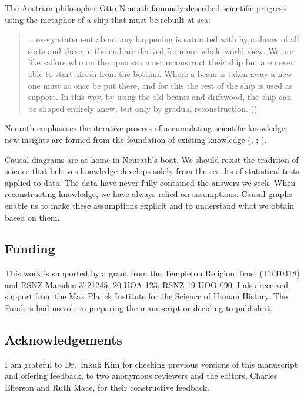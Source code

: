 \documentclass[
  single column]{article}
\begin{document}
The Austrian philosopher Otto Neurath famously described scientific
progress using the metaphor of a ship that must be rebuilt at sea:

\begin{quote}
\ldots{} every statement about any happening is saturated with
hypotheses of all sorts and these in the end are derived from our whole
world-view. We are like sailors who on the open sea must reconstruct
their ship but are never able to start afresh from the bottom. Where a
beam is taken away a new one must at once be put there, and for this the
rest of the ship is used as support. In this way, by using the old beams
and driftwood, the ship can be shaped entirely anew, but only by gradual
reconstruction. ()
\end{quote}

Neurath emphasises the iterative process of accumulating scientific
knowledge; new insights are formed from the foundation of existing
knowledge (,
;
).

Causal diagrams are at home in Neurath's boat. We should resist the
tradition of science that believes knowledge develops solely from the
results of statistical tests applied to data. The data have never fully
contained the answers we seek. When reconstructing knowledge, we have
always relied on assumptions. Causal graphs enable us to make these
assumptions explicit and to understand what we obtain based on them.

\newpage{}

\subsection{Funding}\label{funding}

This work is supported by a grant from the Templeton Religion Trust
(TRT0418) and RSNZ Marsden 3721245, 20-UOA-123; RSNZ 19-UOO-090. I also
received support from the Max Planck Institute for the Science of Human
History. The Funders had no role in preparing the manuscript or deciding
to publish it.

\subsection{Acknowledgements}\label{acknowledgements}

I am grateful to Dr.~Inkuk Kim for checking previous versions of this
manuscript and offering feedback, to two anonymous reviewers and the
editors, Charles Efferson and Ruth Mace, for their constructive
feedback.
\end{document}

